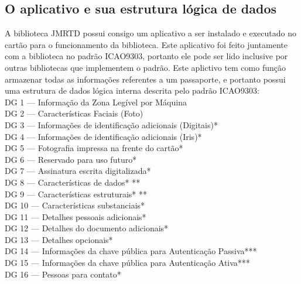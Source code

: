 \documentclass{article}
\begin{document}
	\subsection{O aplicativo e sua estrutura lógica de dados}
		\begin{justify}

			\hspace{2cm} A biblioteca JMRTD possui consigo um aplicativo a ser instalado e executado no cartão para o funcionamento da biblioteca\cite{SASSO}. Este aplicativo foi feito juntamente com a biblioteca no padrão ICAO9303, portanto ele pode ser lido inclusive por outras bibliotecas que implementem o padrão. Este aplictivo tem como função armazenar todas as informações referentes a um passaporte, e portanto possui uma estrutura de dados lógica interna descrita pelo padrão ICAO9303:\\
			
			\hspace*{1.5cm} DG 1 — Informação da Zona Legível por Máquina\\
			\hspace*{2cm} DG 2 — Características Faciais (Foto)\\
			\hspace*{2cm} DG 3 — Informações de identificação adicionais (Digitais)*\\
			\hspace*{2cm} DG 4 — Informações de identificação adicionais (Iris)*\\
			\hspace*{2cm} DG 5 — Fotografia impressa na frente do cartão*\\
			\hspace*{2cm} DG 6 — Reservado para uso futuro*\\
			\hspace*{2cm} DG 7 — Assinatura escrita digitalizada*\\
			\hspace*{2cm} DG 8 — Características de dados* **\\
			\hspace*{2cm} DG 9 — Características estruturais* **\\
			\hspace*{2cm} DG 10 — Características substanciais*\\
			\hspace*{2cm} DG 11 — Detalhes pessoais adicionais*\\
			\hspace*{2cm} DG 12 — Detalhes do documento adicionais*\\
			\hspace*{2cm} DG 13 — Detalhes opcionais*\\
			\hspace*{2cm} DG 14 — Informações da chave pública para Autenticação Passiva***\\
			\hspace*{2cm} DG 15 — Informações da chave pública para Autenticação Ativa***\\
			\hspace*{2cm} DG 16 — Pessoas para contato*\\


\end{justify}
\end{document}

